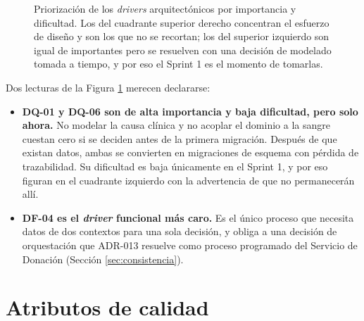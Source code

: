 \documentclass[11pt,a4paper]{article}
\begin{document}
\begin{figure}[h!]
\caption[Priorización de los drivers arquitectónicos]{Priorización de los \emph{drivers} arquitectónicos por importancia y dificultad. Los del cuadrante superior derecho concentran el esfuerzo de diseño y son los que no se recortan; los del superior izquierdo son igual de importantes pero se resuelven con una decisión de modelado tomada a tiempo, y por eso el Sprint 1 es el momento de tomarlas.}
\label{fig:cuadrantedrivers}
\end{figure}

\noindent Dos lecturas de la Figura \ref{fig:cuadrantedrivers} merecen declararse:

\begin{itemize}
\item \textbf{DQ-01 y DQ-06 son de alta importancia y baja dificultad, pero solo ahora.} No modelar la causa clínica y no acoplar el dominio a la sangre cuestan cero si se deciden antes de la primera migración. Después de que existan datos, ambas se convierten en migraciones de esquema con pérdida de trazabilidad. Su dificultad es baja únicamente en el Sprint 1, y por eso figuran en el cuadrante izquierdo con la advertencia de que no permanecerán allí.
\item \textbf{DF-04 es el \emph{driver} funcional más caro.} Es el único proceso que necesita datos de dos contextos para una sola decisión, y obliga a una decisión de orquestación que ADR-013 resuelve como proceso programado del Servicio de Donación (Sección \ref{sec:consistencia}).
\end{itemize}

\section{Atributos de calidad}
\label{sec:atributos}
\end{document}
